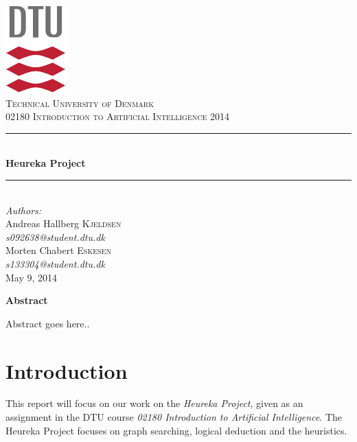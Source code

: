 \documentclass[11pt]{article}
\newcommand{\HRule}{\rule{\linewidth}{0.5mm}}
\begin{document}
\begin{titlepage}
\begin{center}

\includegraphics[scale=2.0]{GFX/dtu_logo.pdf}\\[1cm]

\textsc{\LARGE Technical University of Denmark}\\[1cm]

\textsc{\Large 02180 Introduction to Artificial Intelligence 2014}\\[0.5cm]


\HRule \\[0.4cm]
{\huge \bfseries Heureka Project}\\[0.1cm]
\HRule \\[1cm]

\large
\emph{Authors:}
\\[10pt]
Andreas Hallberg \textsc{Kjeldsen}\\
\emph{s092638@student.dtu.dk}
\\[10pt]
Morten Chabert \textsc{Eskesen}\\
\emph{s133304@student.dtu.dk}\\[1cm]

{\large May 9, 2014}\\[1.5cm]
\end{center}

\begin{center}
	\textbf{Abstract}
\end{center}
Abstract goes here..



\end{titlepage}

\section{Introduction}
\label{sec:intro}
This report will focus on our work on the \emph{Heureka Project}, given as an assignment in the DTU course \emph{02180 Introduction to Artificial Intelligence}. The Heureka Project focuses on graph searching, logical deduction and the heuristics.
\end{document}
